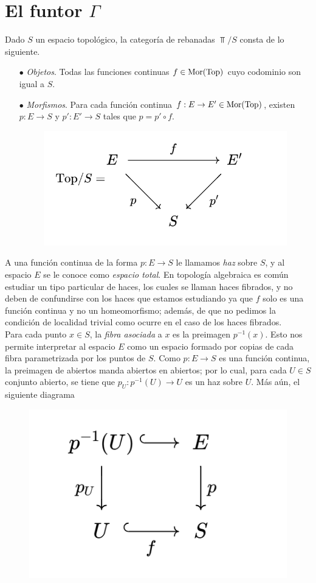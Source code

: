 \section{El funtor $\Gamma$} 
Dado $S$ un espacio topológico, la categoría de rebanadas $\Top/S$ consta de lo siguiente.
\begin{enumerate}
    \item[$\bullet$] \emph{Objetos}. Todas las funciones continuas $f\in{\mathrm{Mor}}({\mathrm{Top}})$ cuyo codominio son igual a $S$.
    \item[$\bullet$] \emph{Morfismos}. Para cada función continua $f:E\to E'\in{\mathrm{Mor}}({\mathrm{Top}})$, existen $p:E\to S$ y $p':E'\to S$ tales que $p=p'\circ f$.
    \begin{figure}[H]
        \centering
        \includegraphics[width=0.42\linewidth]{img/diagram2.2.1.png}
    \end{figure}
\end{enumerate}
A una función continua de la forma $p:E\to S$ le llamamos \emph{haz} sobre $S$, y al espacio $E$ se le conoce como \emph{espacio total}. En topología algebraica es común estudiar un tipo particular de haces, los cuales se llaman haces fibrados, y no deben de confundirse con los haces que estamos estudiando ya que $f$ solo es una función continua y no un homeomorfismo; además, de que no pedimos la condición de localidad trivial como ocurre en el caso de los haces fibrados. \\
Para cada punto $x\in S$, la \emph{fibra asociada} a $x$ es la preimagen  $p^{-1}(x)$. Esto nos permite interpretar al espacio $E$ como un espacio formado por copias de cada fibra parametrizada por los puntos de $S$. Como $p:E\to S$ es una función continua, la preimagen de abiertos manda abiertos en abiertos; por lo cual, para cada $U\in S$ conjunto abierto, se tiene que $p_U:p^{-1}(U)\to U$ es un haz sobre $U$. Más aún, el siguiente diagrama
    \begin{figure}[H]
        \centering
        \includegraphics[width=0.32\linewidth]{img/diagram2.2.2.png}
    \end{figure}

